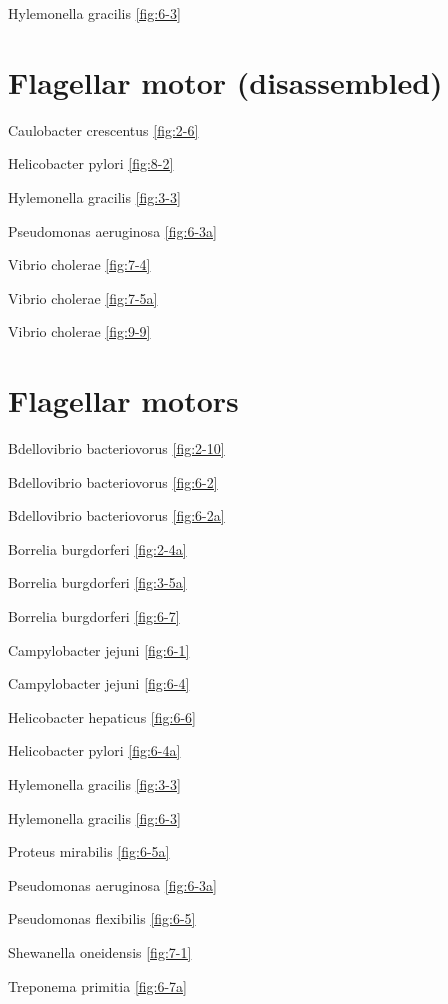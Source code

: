 \documentclass[]{tufte-book}
\begin{document}
Hylemonella gracilis \ref{fig:6-3}

\hypertarget{flagellar-motor-disassembled}{%
\section*{Flagellar motor (disassembled)}\label{flagellar-motor-disassembled}}

Caulobacter crescentus \ref{fig:2-6}

Helicobacter pylori \ref{fig:8-2}

Hylemonella gracilis \ref{fig:3-3}

Pseudomonas aeruginosa \ref{fig:6-3a}

Vibrio cholerae \ref{fig:7-4}

Vibrio cholerae \ref{fig:7-5a}

Vibrio cholerae \ref{fig:9-9}

\hypertarget{flagellar-motors}{%
\section*{Flagellar motors}\label{flagellar-motors}}

Bdellovibrio bacteriovorus \ref{fig:2-10}

Bdellovibrio bacteriovorus \ref{fig:6-2}

Bdellovibrio bacteriovorus \ref{fig:6-2a}

Borrelia burgdorferi \ref{fig:2-4a}

Borrelia burgdorferi \ref{fig:3-5a}

Borrelia burgdorferi \ref{fig:6-7}

Campylobacter jejuni \ref{fig:6-1}

Campylobacter jejuni \ref{fig:6-4}

Helicobacter hepaticus \ref{fig:6-6}

Helicobacter pylori \ref{fig:6-4a}

Hylemonella gracilis \ref{fig:3-3}

Hylemonella gracilis \ref{fig:6-3}

Proteus mirabilis \ref{fig:6-5a}

Pseudomonas aeruginosa \ref{fig:6-3a}

Pseudomonas flexibilis \ref{fig:6-5}

Shewanella oneidensis \ref{fig:7-1}

Treponema primitia \ref{fig:6-7a}
\end{document}
